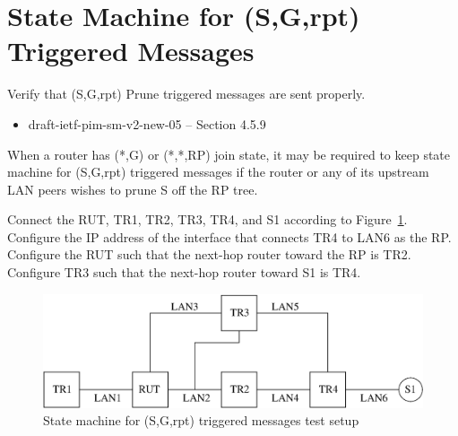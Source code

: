 \documentclass[11pt]{report}
\begin{document}
\newpage
\section{State Machine for (S,G,rpt) Triggered Messages}

Verify that (S,G,rpt) Prune triggered messages are sent properly.

\begin{itemize}
  \item draft-ietf-pim-sm-v2-new-05 -- Section 4.5.9
\end{itemize}

When a router has (*,G) or (*,*,RP) join state, it may be required to keep
state machine for (S,G,rpt) triggered messages if the router or any of its
upstream LAN peers wishes to prune S off the RP tree.

Connect the RUT, TR1, TR2, TR3, TR4, and S1 according to
Figure~\ref{fig:pim_test_4_9_state_machine_for_sg_rpt_triggered_messages}.
Configure the IP address of the interface that connects TR4 to LAN6 as the RP.
Configure the RUT such that the next-hop router toward the RP is TR2.
Configure TR3 such that the next-hop router toward S1 is TR4.

\begin{figure}[htbp]
  \begin{center}
    \includegraphics[scale=0.8]{figs/pim_test_4_9_state_machine_for_sg_rpt_triggered_messages}
    \caption{State machine for (S,G,rpt) triggered messages test setup}
    \label{fig:pim_test_4_9_state_machine_for_sg_rpt_triggered_messages}
  \end{center}
\end{figure}


\end{document}
